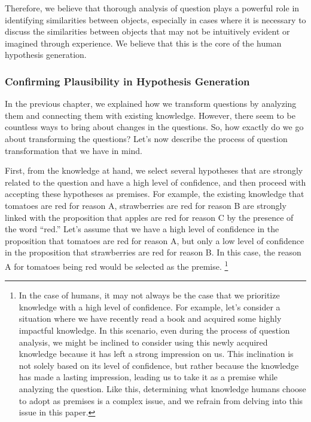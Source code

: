 Therefore, we believe that thorough analysis of question plays a powerful role in identifying similarities between objects, especially in cases where it is necessary to discuss the similarities between objects that may not be intuitively evident or imagined through experience. We believe that this is the core of the human hypothesis generation.

\subsubsection{Confirming Plausibility in Hypothesis Generation}

In the previous chapter, we explained how we transform questions by analyzing them and connecting them with existing knowledge. However, there seem to be countless ways to bring about changes in the questions. So, how exactly do we go about transforming the questions? Let's now describe the process of question transformation that we have in mind.


First, from the knowledge at hand, we select several hypotheses that are strongly related to the question and have a high level of confidence, and then proceed with accepting these hypotheses as premises. For example, the existing knowledge that tomatoes are red for reason A, strawberries are red for reason B  are strongly linked with the proposition that apples are red for reason C by the presence of the word ``red.'' Let's assume that we have a high level of confidence in the proposition that tomatoes are red for reason A, but only a low level of confidence in the proposition that strawberries are red for reason B. In this case, the reason A for tomatoes being red would be selected as the premise. \footnote{
In the case of humans, it may not always be the case that we prioritize knowledge with a high level of confidence. For example, let's consider a situation where we have recently read a book and acquired some highly impactful knowledge. In this scenario, even during the process of question analysis, we might be inclined to consider using this newly acquired knowledge because it has left a strong impression on us. This inclination is not solely based on its level of confidence, but rather because the knowledge has made a lasting impression, leading us to take it as a premise while analyzing the question. Like this, determining what knowledge humans choose to adopt as premises is a complex issue, and we refrain from delving into this issue in this paper.
}

